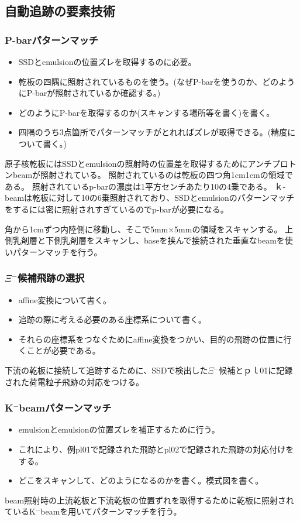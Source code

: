 \documentclass[12pt,a4paper]{jarticle}
\begin{document}
\subsection{自動追跡の要素技術}
\subsubsection{P-barパターンマッチ}
\begin{itemize}
    \item SSDとemulsionの位置ズレを取得するのに必要。
    \item 乾板の四隅に照射されているものを使う。(なぜP-barを使うのか、どのようにP-barが照射されているか確認する。)
    \item どのようにP-barを取得するのか(スキャンする場所等を書く)を書く。
    \item 四隅のうち3点箇所でパターンマッチがとれればズレが取得できる。(精度について書く。)
\end{itemize}
原子核乾板にはSSDとemulsionの照射時の位置差を取得するためにアンチプロトンbeamが照射されている。
照射されているのは乾板の四つ角1cm1cmの領域である。
照射されているp-barの濃度は1平方センチあたり10の4乗である。
ｋ-beamは乾板に対して10の6乗照射されており、SSDとemulsionのパターンマッチをするには密に照射されすぎているのでp-barが必要になる。
\par
角から1cmずつ内陸側に移動し、そこで5mm×5mmの領域をスキャンする。
上側乳剤層と下側乳剤層をスキャンし、baseを挟んで接続された垂直なbeamを使いパターンマッチを行う。
\par
\subsubsection{$\Xi$$^-$候補飛跡の選択}
\begin{itemize}
    \item affine変換について書く。
    \item 追跡の際に考える必要のある座標系について書く。
    \item それらの座標系をつなぐためにaffine変換をつかい、目的の飛跡の位置に行くことが必要である。
\end{itemize}
下流の乾板に接続して追跡するために、SSDで検出した$\Xi$$^-$候補とｐｌ01に記録された荷電粒子飛跡の対応をつける。
\subsubsection{K$^-$beamパターンマッチ}
\begin{itemize}
    \item emulsionとemulsionの位置ズレを補正するために行う。
    \item これにより、例pl01で記録された飛跡とpl02で記録された飛跡の対応付けをする。
    \item どこをスキャンして、どのようになるのかを書く。模式図を書く。
\end{itemize}
beam照射時の上流乾板と下流乾板の位置ずれを取得するために乾板に照射されているK$^-$beamを用いてパターンマッチを行う。
\end{document}
